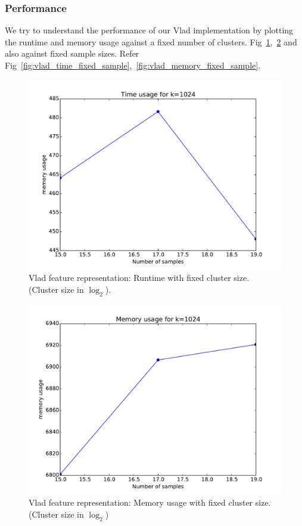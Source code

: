 \documentclass[final,leqno,onefignum,onetabnum]{siamltexmm}
\begin{document}
\subsubsection{Performance}
We try to understand the performance of our Vlad implementation by plotting the runtime and memory usage against a fixed number of clusters.  Fig~\ref{fig:vlad_time_fixed_cluster},~\ref{fig:vlad_memory_fixed_cluster} and also against fixed sample sizes. Refer Fig~\ref{fig:vlad_time_fixed_sample},~\ref{fig:vlad_memory_fixed_sample}.
\begin{figure}
  \centering
  \includegraphics[width=0.60\linewidth]{images/vladTimeFixedCluster}
  \caption{Vlad feature representation: Runtime with fixed cluster size. (Cluster size in $\log_{2}$).\label{fig:vlad_time_fixed_cluster}}
\end{figure}
\begin{figure}
  \centering
  \includegraphics[width=0.60\linewidth]{images/vladMemoryFixedCluster}
  \caption{Vlad feature representation: Memory usage with fixed cluster size. (Cluster size in $\log_{2}$)\label{fig:vlad_memory_fixed_cluster}}
\end{figure}
\end{document}
